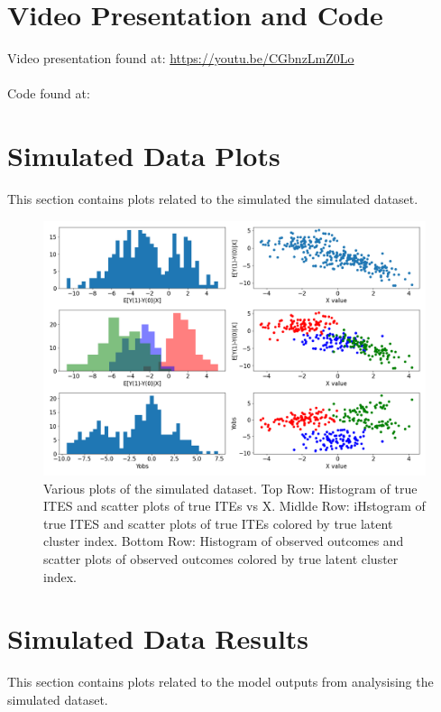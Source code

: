 \documentclass{article}
\begin{document}
\begin{appendices}
\section{Video Presentation and Code}
Video presentation found at: \url{https://youtu.be/CGbnzLmZ0Lo}
\\ \\
Code found at:

\section{Simulated Data Plots}
This section contains plots related to the simulated the simulated dataset.
\begin{figure}[h]
  \centering
  \includegraphics[width=1\textwidth]{Plots/simulated_data_info.png}
  \caption{Various plots of the simulated dataset. Top Row: Histogram of true ITES and scatter plots of true ITEs vs X. Midlde Row: iHstogram of true ITES and scatter plots of true ITEs colored by true latent cluster index. Bottom Row: Histogram of observed outcomes and scatter plots of observed outcomes colored by true latent cluster index.}
  \label{fig:sim_data_info}
\end{figure}

\section{Simulated Data Results}
This section contains plots related to the model outputs from analysising the simulated dataset.


\end{appendices}
\end{document}
